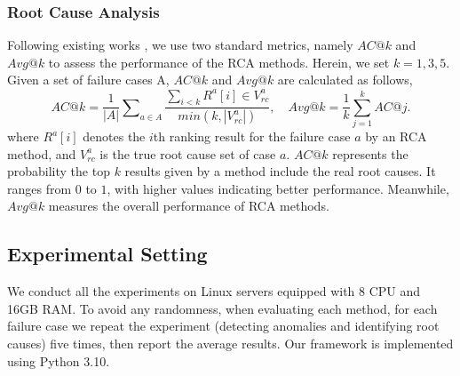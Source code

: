 \subsubsection{Root Cause Analysis}

Following existing works \cite{Wang2018cloudranger, Ma2019Msrank, Ma2020Automap, Meng2020Microcause, yu2021microrank, wu2020microrca, wu2021microdiag, Azam2022rcd, Li2022Circa, Xin2023CausalRCA}, we use two standard metrics, namely $AC@k$ and $Avg@k$ to assess the performance of the RCA methods. Herein, we set $k = 1, 3, 5$. Given a set of failure cases A, $AC@k$ and $Avg@k$ are calculated as follows,
\begin{equation}
    AC@k = \frac{1}{|A|} \sum\nolimits_{a\in A}\frac{\sum_{i<k}R^a[i]\in V^a_{rc}}{min(k, |V^a_{rc}|)}, \quad Avg@k = \frac{1}{k}\sum_{j=1}^k AC@j.
\end{equation}
where $R^a[i]$ denotes the $i$th ranking result for the failure case $a$ by an RCA method, and $V^a_{rc}$ is the true root cause set of case $a$. $AC@k$ represents the probability the top $k$ results given by a method include the real root causes. It ranges from $0$ to $1$, with higher values indicating better performance.
Meanwhile, $Avg@k$ measures the overall performance of RCA methods.



\subsection{Experimental Setting}
We conduct all the experiments on Linux servers equipped with 8 CPU and 16GB RAM. To avoid any randomness, when evaluating each method, for each failure case we repeat the experiment (detecting anomalies and identifying root causes) five times, then report the average results. Our framework is implemented using Python 3.10.


